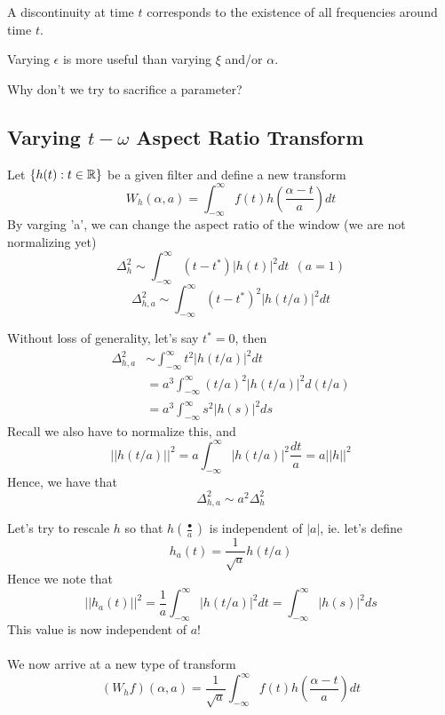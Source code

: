 \documentclass{article}
\begin{document}
A discontinuity at time $t$ corresponds to the existence of all frequencies around time $t$.

\begin{claim}
Varying $\epsilon$ is more useful than varying $\xi$ and/or $\alpha$.
\end{claim}

\begin{question}
    Why don't we try to sacrifice a parameter?
\end{question}

\subsection{Varying $t-\omega$ Aspect Ratio Transform}

Let $\{h(t): t \in \mathbb{R}\}$ be a given filter and define a new transform
\[W_h(\alpha, a) = \int_{-\infty}^\infty f(t) h(\frac{\alpha - t}{a}) dt\]
By varging 'a', we can change the aspect ratio of the window (we are not normalizing yet)
\[\Delta_h^2 \sim \int_{-\infty}^\infty (t - t^*) |h(t)|^2 dt\ \ (a = 1)\]
\[\Delta_{h, a}^2 \sim \int_{-\infty}^\infty (t - t^*)^2 |h(t/a)|^2 dt\]

Without loss of generality, let's say $t^* = 0$, then
\begin{align*}
    \Delta_{h, a}^2 &\sim \int_{-\infty}^\infty t^2 |h(t/a)|^2 dt\\
    &=a^3 \int_{-\infty}^\infty (t/a)^2 |h(t/a)|^2 d(t/a)\\
    &= a^3 \int_{-\infty}^\infty s^2 |h(s)|^2 ds
\end{align*}
Recall we also have to normalize this, and
\[||h(t/a)||^2 = a \int_{-\infty}^\infty |h(t/a)|^2 \frac{dt}{a} = a ||h||^2\]
Hence, we have that
\[\Delta_{h, a}^2 \sim a^2 \Delta_h^2\]

Let's try to rescale $h$ so that $h(\frac{\bullet}{a})$ is independent of $|a|$, ie. let's define
\[h_a(t) = \frac{1}{\sqrt{a}} h(t/a)\]
Hence we note that
\[||h_a(t)||^2 = \frac{1}{a} \int_{-\infty}^\infty |h(t/a)|^2 dt = \int_{-\infty}^\infty |h(s)|^2 ds\]
This value is now independent of $a$!\\\\

We now arrive at a new type of transform
\[(W_h f)(\alpha, a) = \frac{1}{\sqrt{a}} \int_{-\infty}^\infty f(t) h(\frac{\alpha - t}{a}) dt\]
\end{document}
